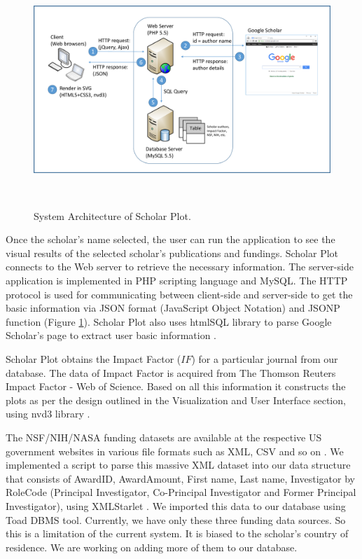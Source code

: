 \begin{figure}[H]
\centering
  \includegraphics[width=1\textwidth]{figures/fig_system_architecture.pdf}
  \caption{System Architecture of Scholar Plot.}~\label{fig-arch}
\end{figure}

Once the scholar's name selected, the user can run the application to see the visual results of the selected scholar's publications and fundings. Scholar Plot connects to the Web server to retrieve the necessary information.
The server-side application is implemented in PHP scripting language and MySQL. The HTTP protocol is used for communicating between client-side and server-side to get the basic information via JSON format (JavaScript Object Notation) and JSONP function (Figure \ref{fig-arch}). Scholar Plot also uses htmlSQL library to parse Google Scholar's page to extract user basic information \cite{htmlSQL}.


Scholar Plot obtains the Impact Factor ($IF$) for a particular journal from our database. The data of Impact Factor is acquired from The Thomson Reuters Impact Factor - Web of Science. Based on all this information it constructs the plots as per the design outlined in the Visualization and User Interface section, using nvd3 library \cite{nvd3org}.

The NSF/NIH/NASA funding datasets are available at the respective US government websites in various file formats such as XML, CSV and so on \cite{nsf, nih, nasa}. We implemented a script to parse this massive XML dataset into our data structure that consists of AwardID, AwardAmount, First name, Last name, Investigator by RoleCode (Principal Investigator, Co-Principal Investigator and Former Principal Investigator), using XMLStarlet \cite{XMLStarlet}. We imported this data to our database using Toad DBMS tool. Currently, we have only these three funding data sources. So this is a limitation of the current system. It is biased to the scholar's country of residence. We are working on adding more of them to our database. %




